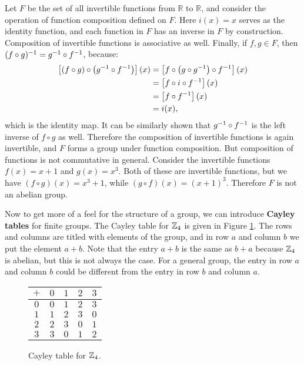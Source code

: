 \begin{example}
Let $F$ be the set of all invertible functions from $\mathbb{R}$ to $\mathbb{R}$, and consider the operation of function composition defined on $F$. Here $i(x) = x$ serves as the identity function, and each function in $F$ has an inverse in $F$ by construction. Composition of invertible functions is associative as well. Finally, if $f, g \in F$, then $\inv{(f \circ g)} = \inv g \circ \inv f$, because: 
\begin{align*}
\left[(f \circ g) \circ \left(\inv g \circ \inv f\right) \right](x) &= \left[f \circ \left(g \circ \inv g\right) \circ \inv f \right](x) \\
&= \left[f \circ i \circ \inv f\right](x) \\
&= \left[f \circ \inv f\right](x) \\
&= i(x)\mathrm{,}
\end{align*}
which is the identity map. It can be similarly shown that $\inv g \circ \inv f$ is the left inverse of $f \circ g$ as well. Therefore the composition of invertible functions is again invertible, and $F$ forms a group under function composition. But composition of functions is not commutative in general. Consider the invertible functions $f(x) = x+1$ and $g(x) = x^3$. Both of these are invertible functions, but we have $(f \circ g)(x) = x^3 + 1$, while $(g \circ f)(x) = (x+1)^3$. Therefore $F$ is not an abelian group.
\end{example}

Now \extra to get more of a feel for the structure of a group, we can introduce \textbf{Cayley tables} for finite groups. The Cayley table for $\zn[4]$ is given in Figure \ref{z4}. The rows and columns are titled with elements of the group, and in row $a$ and column $b$ we put the element $a + b$. Note that the entry $a + b$ is the same as $b + a$ because $\zn[4]$ is abelian, but this is not always the case. For a general group, the entry in row $a$ and column $b$ could be different from the entry in row $b$ and column $a$.

\begin{figure}[ht]
\centering
\begin{tabular}{c | c c c c}
    $+$ & $0$ & $1$ & $2$ & $3$ \\
    \hline
    $0$ & $0$ & $1$ & $2$ & $3$ \\
    $1$ & $1$ & $2$ & $3$ & $0$ \\
    $2$ & $2$ & $3$ & $0$ & $1$ \\
    $3$ & $3$ & $0$ & $1$ & $2$
\end{tabular}
\caption{Cayley table for $\zn[4]$.}
\label{z4}
\end{figure}

